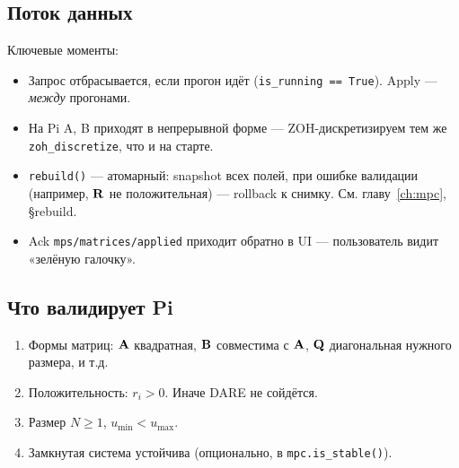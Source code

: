 \subsection{Поток данных}

\begin{center}
\end{center}

Ключевые моменты:

\begin{itemize}
  \item Запрос отбрасывается, если прогон идёт (\texttt{is\_running ==
        True}). Apply --- \emph{между} прогонами.
  \item На Pi A, B приходят в непрерывной форме --- ZOH-дискретизируем
        тем же \texttt{zoh\_discretize}, что и на старте.
  \item \texttt{rebuild()} --- атомарный: snapshot всех полей, при
        ошибке валидации (например, $\mathbf{R}$ не положительная) ---
        rollback к снимку. См. главу~\ref{ch:mpc}, §rebuild.
  \item Ack \texttt{mps/matrices/applied} приходит обратно в UI ---
        пользователь видит «зелёную галочку».
\end{itemize}

\subsection{Что валидирует Pi}

\begin{enumerate}
  \item Формы матриц: $\mathbf{A}$ квадратная, $\mathbf{B}$ совместима с
        $\mathbf{A}$, $\mathbf{Q}$ диагональная нужного размера, и т.д.
  \item Положительность: $r_i > 0$. Иначе DARE не сойдётся.
  \item Размер $N \ge 1$, $u_\text{min} < u_\text{max}$.
  \item Замкнутая система устойчива (опционально, в \texttt{mpc.is\_stable()}).
\end{enumerate}

